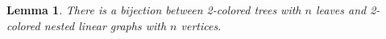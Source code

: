 \documentclass[twoside, 12pt]{amsart}
\newtheorem{lemma}[definition]{Lemma}
\theoremstyle{remark}
\begin{document}
\begin{lemma} 
\label{lemma:bijection}
There is a bijection between 2-colored trees with $n$ leaves and 2-colored nested linear graphs with $n$ vertices. 
\begin{figure}[h!]
\resizebox{0.8\linewidth}{!}{
















}
\end{figure}
\end{lemma}
\end{document}
